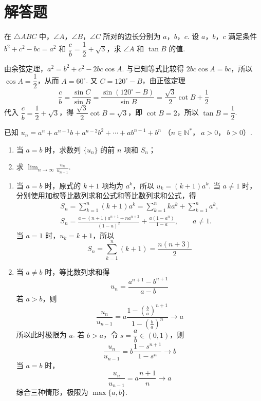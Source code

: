 \section{解答题}

\begin{problem}
在 \(\triangle ABC\) 中，\(\angle A\)，\(\angle B\)，\(\angle C\) 所对的边长分别为
\(a\)，\(b\)，\(c\). 设 \(a\)，\(b\)，\(c\) 满足条件
\(b^2+c^2-bc=a^2\) 和 \(\dfrac cb=\dfrac12+\sqrt3\)，求
\(\angle A\) 和 \(\tan B\) 的值.
\end{problem}

\begin{solution}
由余弦定理，\(a^2=b^2+c^2-2bc\cos A\). 与已知等式比较得
\(2bc\cos A=bc\)，所以 \(\cos A=\dfrac12\)，从而 \(A=60^\circ\).
又 \(C=120^\circ-B\)，由正弦定理
\[
\frac cb
=\frac{\sin C}{\sin B}
=\frac{\sin(120^\circ-B)}{\sin B}
=\frac{\sqrt3}{2}\cot B+\frac12
\]
代入 \(\dfrac cb=\dfrac12+\sqrt3\)，得 \(\dfrac{\sqrt3}{2}\cot B=\sqrt3\)，即
\(\cot B=2\)，所以 \(\tan B=\dfrac12\).
\end{solution}

\begin{problem}
已知 \(u_n=a^n+a^{n-1}b+a^{n-2}b^2+\cdots+ab^{n-1}+b^n\)
（\(n\in\mathbb N^*\)，\(\ a>0\)，\(\ b>0\)）.

\begin{enumerate}
\item 当 \(a=b\) 时，求数列 \(\{u_n\}\) 的前 \(n\) 项和 \(S_n\)；
\item 求 \(\displaystyle\lim_{n\to\infty}\frac{u_n}{u_{n-1}}\).
\end{enumerate}
\end{problem}

\begin{solution}
\begin{enumerate}
\item 当 \(a=b\) 时，原式的 \(k+1\) 项均为 \(a^k\)，所以 \(u_k=(k+1)a^k\). 当
\(a\ne1\) 时，分别使用加权等比数列求和公式和等比数列求和公式，得
\[
\begin{gathered}
S_n=\sum_{k=1}^n(k+1)a^k=\sum_{k=1}^nka^k+\sum_{k=1}^na^k,\\
S_n=\frac{a-(n+1)a^{n+1}+na^{n+2}}{(1-a)^2}
  +\frac{a(1-a^n)}{1-a},\qquad a\ne1.
\end{gathered}
\]
当 \(a=1\) 时，\(u_k=k+1\)，所以
\[
S_n=\sum_{k=1}^n(k+1)=\frac{n(n+3)}2
\]
\item 当 \(a\ne b\) 时，等比数列求和得
\[
u_n=\frac{a^{n+1}-b^{n+1}}{a-b}
\]
若 \(a>b\)，则
\[
\frac{u_n}{u_{n-1}}
=a\frac{1-(\frac{b}{a})^{n+1}}{1-(\frac{b}{a})^n}\longrightarrow a
\]
所以此时极限为 \(a\).
若 \(b>a\)，令 \(s=\dfrac ab\in(0,1)\)，则
\[
\frac{u_n}{u_{n-1}}
=b\frac{1-s^{n+1}}{1-s^n}\longrightarrow b
\]
当 \(a=b\) 时，
\[
\frac{u_n}{u_{n-1}}=a\frac{n+1}{n}\longrightarrow a
\]
综合三种情形，极限为 \(\max\{a,b\}\).
\end{enumerate}
\end{solution}


